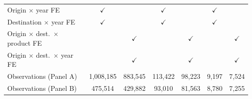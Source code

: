 \begin{tabular}{lcccccc}
Origin $\times$ year FE & $\checkmark$ &  & $\checkmark$ &  & $\checkmark$ &  \\
Destination $\times$ year FE & $\checkmark$ &  & $\checkmark$ &  & $\checkmark$ &  \\
Origin $\times$ dest.\ $\times$ product FE &  & $\checkmark$ &  & $\checkmark$ &  & $\checkmark$ \\
Origin $\times$ dest.\ $\times$ year FE &  & $\checkmark$ &  & $\checkmark$ &  & $\checkmark$ \\
Observations (Panel A) & 1,008,185 & 883,545 & 113,422 & 98,223 & 9,197 & 7,524 \\
Observations (Panel B) & 475,514 & 429,882 & 93,010 & 81,563 & 8,780 & 7,255 \\
\hline
\end{tabular}
